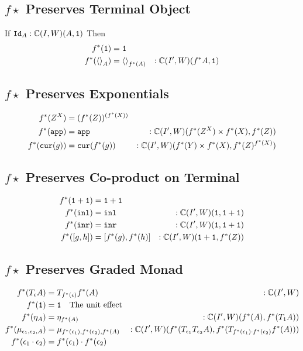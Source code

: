 \documentclass{report}
\begin{document}
\subsection{$f\star$ Preserves Terminal Object}
If $\texttt{Id}_{A}:\mathbb{C}(I, W)(A, \texttt{1})$
Then 
\begin{align}
    f^*(\texttt{1}) & = \texttt{1} \\
    f^*(\left\langle\right\rangle_{A}) & = \left\langle\right\rangle_{f^*(A)}&:\mathbb{C}(I', W)(f^* A, \texttt{1})\\
\end{align}

\subsection{$f\star$ Preserves Exponentials}
\begin{align}
    f^*(Z^X) & = (f^*(Z))^{(f^*(X))}\\
     f^*(\texttt{app}) &= \texttt{app}&:\mathbb{C}(I', W)(f^*(Z^X)\times f^*(X), f^*(Z))\\
     f^*(\texttt{cur}(g)) &= \texttt{cur}(f^*(g))&:\mathbb{C}(I', W)(f^*(Y)\times f^*(X), f^*(Z)^{f^*(X)})
\end{align}

\subsection{$f\star$ Preserves Co-product on Terminal}

\begin{align}
    f^*(\texttt{1}+\texttt{1}) &= \texttt{1}+\texttt{1}\\
    f^*(\texttt{inl})  &= \texttt{inl}&:\mathbb{C}(I', W)(\texttt{1}, \texttt{1}+\texttt{1}) \\
    f^*(\texttt{inr}) &= \texttt{inr}&:\mathbb{C}(I', W)(\texttt{1}, \texttt{1}+\texttt{1}) \\
    f^*([g, h]) &= [f^*(g), f^*(h)]&:\mathbb{C}(I', W)(\texttt{1}+\texttt{1}, f^*(Z))
\end{align}

\subsection{$f\star$ Preserves Graded Monad}
\begin{align}
    f^*(T_{\epsilon}{A}) &= T_{f^*(\epsilon)}{f^*(A)}&:\mathbb{C}(I', W)\\
    f^*(\texttt{1}) &= \texttt{1} \quad\text{The unit effect}\\
    f^*(\eta_{A}) &= \eta_{f^*(A)}&:\mathbb{C}(I', W)(f^*(A), f^*(T_{\texttt{1}}{A}))\\
    f^*(\mu_{\epsilon_1, \epsilon_2, A}) &= \mu_{f^*(\epsilon_1), f^*(\epsilon_2), f^*(A)}&:\mathbb{C}(I', W)(f^*(T_{\epsilon_1}{T_{\epsilon_2}{A}}), f^*(T_{f^*(\epsilon_1)\cdot f^*(\epsilon_2)}{f^*(A)}))\\
    f^*(\epsilon_1\cdot\epsilon_2) &= f^*(\epsilon_1)\cdot f^*(\epsilon_2)\\
\end{align}
\end{document}
